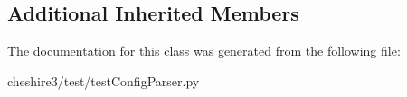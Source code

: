\subsection*{Additional Inherited Members}


The documentation for this class was generated from the following file\-:\begin{DoxyCompactItemize}
\item 
cheshire3/test/test\-Config\-Parser.\-py\end{DoxyCompactItemize}
